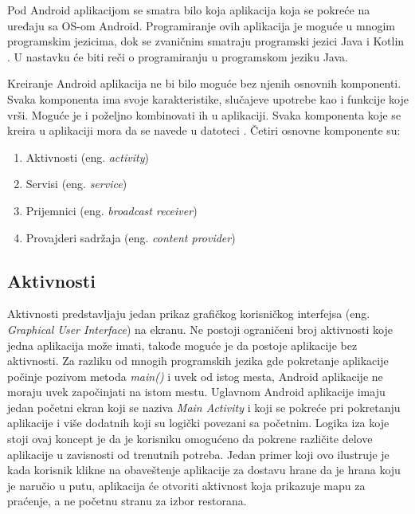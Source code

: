 \documentclass[android.tex]{subfiles}
\begin{document}
Pod Android aplikacijom se smatra bilo koja aplikacija koja se pokreće na uređaju sa OS-om Android. Programiranje ovih aplikacija je moguće u mnogim programskim jezicima, dok se zvaničnim smatraju programski jezici Java i Kotlin \cite{sajt:kotlin}. U nastavku će biti reči o programiranju u programskom jeziku Java.

Kreiranje Android aplikacija ne bi bilo moguće bez njenih osnovnih komponenti. Svaka komponenta ima svoje karakteristike, slučajeve upotrebe kao i funkcije koje vrši. Moguće je i poželjno kombinovati ih u aplikaciji. Svaka komponenta koje se kreira u aplikaciji mora da se navede u datoteci . Četiri osnovne komponente su:

\begin{enumerate}
\item Aktivnosti (eng. \textit{activity})
\item Servisi (eng. \textit{service})
\item Prijemnici (eng. \textit{broadcast receiver})
\item Provajderi sadržaja (eng. \textit{content provider})
\end{enumerate}

\subsection{Aktivnosti}
Aktivnosti predstavljaju jedan prikaz grafičkog korisničkog interfejsa (eng. \textit{Graphical User Interface}) na ekranu. Ne postoji ograničeni broj aktivnosti koje jedna aplikacija može imati, takođe moguće je da postoje aplikacije bez aktivnosti. Za razliku od mnogih programskih jezika gde pokretanje aplikacije počinje pozivom metoda \textit{main()} i uvek od istog mesta, Android aplikacije ne moraju uvek započinjati na istom mestu. Uglavnom Android aplikacije imaju jedan početni ekran koji se naziva \textit{Main Activity} i  koji se pokreće pri pokretanju aplikacije i više dodatnih koji su logički povezani sa početnim. Logika iza koje stoji ovaj koncept je da je korisniku omogućeno da pokrene različite delove aplikacije u zavisnosti od trenutnih potreba. Jedan primer koji ovo ilustruje je kada korisnik klikne na obaveštenje aplikacije za dostavu hrane da je hrana koju je naručio u putu, aplikacija će otvoriti aktivnost koja prikazuje mapu za praćenje, a ne početnu stranu za izbor restorana.
\end{document}
